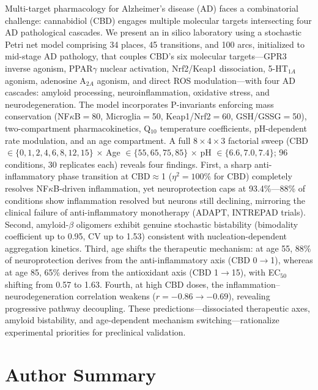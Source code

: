 \documentclass[10pt,letterpaper]{article}
\begin{document}
Multi-target pharmacology for Alzheimer's disease (AD) faces a combinatorial challenge: cannabidiol (CBD) engages multiple molecular targets intersecting four AD pathological cascades. We present an in silico laboratory using a stochastic Petri net model comprising 34 places, 45 transitions, and 100 arcs, initialized to mid-stage AD pathology, that couples CBD's six molecular targets---GPR3 inverse agonism, PPAR$\gamma$ nuclear activation, Nrf2/Keap1 dissociation, 5-HT$_{1A}$ agonism, adenosine A$_{2A}$ agonism, and direct ROS modulation---with four AD cascades: amyloid processing, neuroinflammation, oxidative stress, and neurodegeneration. The model incorporates P-invariants enforcing mass conservation (NF$\kappa$B$=$80, Microglia$=$50, Keap1/Nrf2$=$60, GSH/GSSG$=$50), two-compartment pharmacokinetics, Q$_{10}$ temperature coefficients, pH-dependent rate modulation, and an age compartment. A full $8 \times 4 \times 3$ factorial sweep (CBD $\in \{0, 1, 2, 4, 6, 8, 12, 15\}$ $\times$ Age $\in \{55, 65, 75, 85\}$ $\times$ pH $\in \{6.6, 7.0, 7.4\}$; 96 conditions, 30 replicates each) reveals four findings. First, a sharp anti-inflammatory phase transition at CBD$\approx$1 ($\eta^2=100\%$ for CBD) completely resolves NF$\kappa$B-driven inflammation, yet neuroprotection caps at 93.4\%---88\% of conditions show inflammation resolved but neurons still declining, mirroring the clinical failure of anti-inflammatory monotherapy (ADAPT, INTREPAD trials). Second, amyloid-$\beta$ oligomers exhibit genuine stochastic bistability (bimodality coefficient up to 0.95, CV up to 1.53) consistent with nucleation-dependent aggregation kinetics. Third, age shifts the therapeutic mechanism: at age 55, 88\% of neuroprotection derives from the anti-inflammatory axis (CBD 0$\to$1), whereas at age 85, 65\% derives from the antioxidant axis (CBD 1$\to$15), with EC$_{50}$ shifting from 0.57 to 1.63. Fourth, at high CBD doses, the inflammation--neurodegeneration correlation weakens ($r=-0.86 \to -0.69$), revealing progressive pathway decoupling. These predictions---dissociated therapeutic axes, amyloid bistability, and age-dependent mechanism switching---rationalize experimental priorities for preclinical validation.

\section*{Author Summary}
\end{document}
